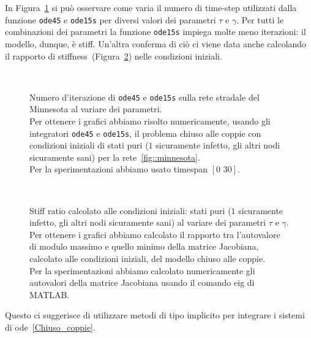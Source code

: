 In Figura~\ref{fig::minnesota_lenght} si pu\`o osservare come varia il numero di time-step  utilizzati dalla  funzione \texttt{ode45} e \texttt{ode15s} per diversi valori dei parametri $\tau$ e $\gamma$. Per tutti le combinazioni dei parametri la funzione \texttt{ode15s} impiega molte meno iterazioni: il modello, dunque, \`e stiff. Un'altra conferma di ci\`o ci viene data anche calcolando il rapporto di stiffness~(Figura~\ref{fig::minnesota_ratiostiff}) nelle condizioni iniziali.\\
\begin{figure}[htbp]
\centering
\subfloat[][$\gamma=0.10$]{}
\subfloat[][$\gamma=0.30$]{}
\\
\subfloat[][$\gamma=0.50$]{}
\subfloat[][$\gamma=0.70$]{}
\caption[Numero d'iterazione di \texttt{ode45} e \texttt{ode15s}  sulla rete stradale del Minnesota al variare dei parametri]{Numero d'iterazione di \texttt{ode45} e \texttt{ode15s}  sulla rete stradale del Minnesota al variare dei parametri.\\Per ottenere i grafici abbiamo risolto numericamente,  usando gli integratori \texttt{ode45} e \texttt{ode15s},  il problema chiuso alle coppie con condizioni iniziali  di stati puri ($1$ sicuramente infetto, gli altri nodi sicuramente sani) per la rete~\ref{fig::minnesota}.\\
Per la sperimentazioni abbiamo usato timespan $[0 \,\,30]$.}
\label{fig::minnesota_lenght}
\end{figure}
\begin{figure}[htbp]
\centering
\subfloat[][$\gamma=0.10$]{}
\subfloat[][$\gamma=0.30$]{}
\\
\subfloat[][$\gamma=0.50$]{}
\subfloat[][$\gamma=0.70$]{}
\caption[Stiff ratio alle condizioni iniziali sulla rete stradale del Minnesota al variare dei parametri ]{Stiff ratio calcolato alle condizioni iniziali:  stati puri ($1$ sicuramente infetto, gli altri nodi sicuramente sani) al variare dei parametri $\tau$ e $\gamma$.\\ Per ottenere i grafici abbiamo calcolato il rapporto tra l'autovalore di modulo massimo e quello minimo della matrice Jacobiana, calcolato alle condizioni iniziali, del modello chiuso alle coppie.\\
Per la sperimentazioni abbiamo calcolato numericamente gli autovalori della matrice Jacobiana usando il comando eig di MATLAB.}
\label{fig::minnesota_ratiostiff}
\end{figure}
Questo ci suggerisce di utilizzare metodi di tipo implicito per integrare i sistemi di ode~\ref{Chiuso_coppie}.

